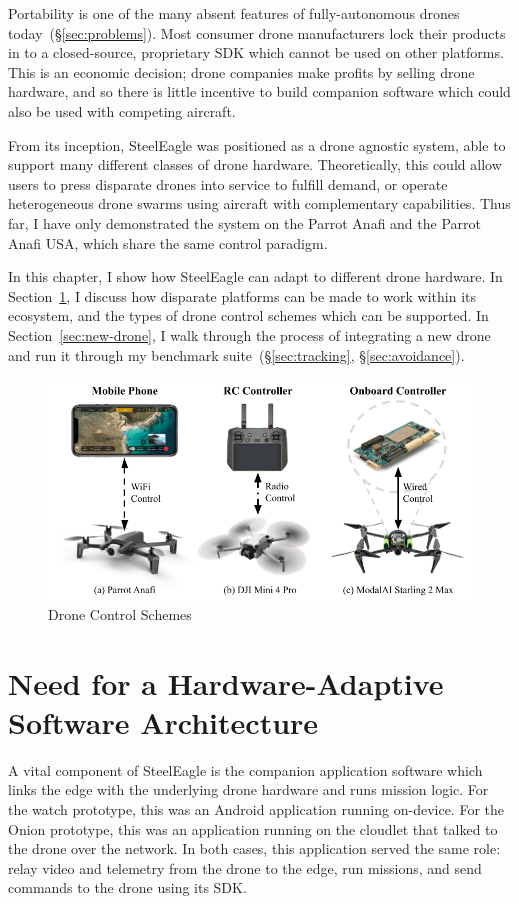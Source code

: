 Portability is one of the many absent features of fully-autonomous drones today~(\S\ref{sec:problems}). Most consumer drone manufacturers lock their products in to a closed-source, proprietary SDK which cannot be used on other platforms. This is an economic decision; drone companies make profits by selling drone hardware, and so there is little incentive to build companion software which could also be used with competing aircraft. 

From its inception, SteelEagle was positioned as a drone agnostic system, able to support many different classes of drone hardware. Theoretically, this could allow users to press disparate drones into service to fulfill demand, or operate heterogeneous drone swarms using aircraft with complementary capabilities. Thus far, I have only demonstrated the system on the Parrot Anafi and the Parrot Anafi USA, which share the same control paradigm.

In this chapter, I show how SteelEagle can adapt to different drone hardware. In Section~\ref{sec:hardware-adaptive-architecture}, I discuss how disparate platforms can be made to work within its ecosystem, and the types of drone control schemes which can be supported. In Section~\ref{sec:new-drone}, I walk through the process of integrating a new drone and run it through my benchmark suite~(\S\ref{sec:tracking}, \S\ref{sec:avoidance}).

\begin{figure}
    \centering
    \includegraphics[width=0.85\linewidth]{chapter7/FIGS/control-schemes.png}
    \caption{Drone Control Schemes}
    \label{fig:control-schemes}
\end{figure}

\section{Need for a Hardware-Adaptive Software Architecture}
\label{sec:hardware-adaptive-architecture}
A vital component of SteelEagle is the companion application software which links the edge with the underlying drone hardware and runs mission logic. For the watch prototype, this was an Android application running on-device. For the Onion prototype, this was an application running on the cloudlet that talked to the drone over the network. In both cases, this application served the same role: relay video and telemetry from the drone to the edge, run missions, and send commands to the drone using its SDK.

